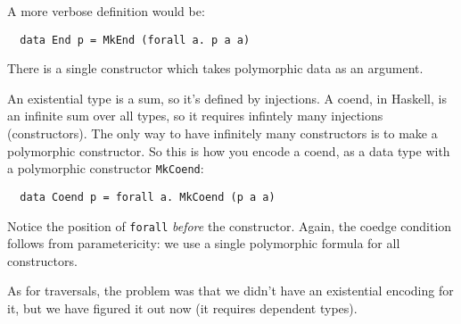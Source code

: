 \documentclass{amsart}
\begin{document}
A more verbose definition would be:
\begin{verbatim}
  data End p = MkEnd (forall a. p a a)
\end{verbatim}
There is a single constructor which takes polymorphic data as an argument.

An existential type is a sum, so it's defined by injections. A coend, in Haskell, is an infinite sum over all types, so it requires infintely many injections (constructors). The only way to have infinitely many constructors is to make a polymorphic constructor. So this is how you encode a coend, as a data type with a polymorphic constructor \verb|MkCoend|:
\begin{verbatim}
  data Coend p = forall a. MkCoend (p a a)
\end{verbatim}
Notice the position of \verb|forall| \textit{before} the constructor. Again, the coedge condition follows from parametericity: we use a single polymorphic formula for all constructors.

As for traversals, the problem was that we didn't have an existential encoding for it, but we have figured it out now (it requires dependent types).

%
\end{document}
